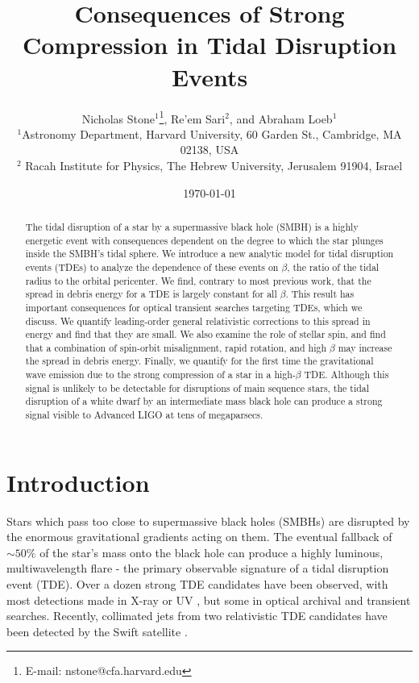 \documentclass[useAMS, twocolumn, usenatbib]{mn2e}
\title{Consequences of Strong Compression in Tidal Disruption Events}
\author[N.~Stone, R.~Sari and A.~Loeb]{Nicholas Stone$^1$\thanks{E-mail:
nstone@cfa.harvard.edu}, Re'em Sari$^2$, and Abraham Loeb$^1$
\\$^1$Astronomy Department, Harvard University, 60 Garden St.,
Cambridge, MA 02138, USA
\\$^2$ Racah Institute for Physics, The Hebrew University, Jerusalem 91904, Israel}
\begin{document}
\date{\today}
\maketitle


\begin{abstract}

The tidal disruption of a star by a supermassive black hole (SMBH) is a highly energetic event with consequences dependent on the degree to which the star plunges inside the SMBH's tidal sphere.  We introduce a new analytic model for tidal disruption events (TDEs) to analyze the dependence of these events on $\beta$, the ratio of the tidal radius to the orbital pericenter.  We find, contrary to most previous work, that the spread in debris energy for a TDE is largely constant for all $\beta$.  This result has important consequences for optical transient searches targeting TDEs, which we discuss.  We quantify leading-order general relativistic corrections to this spread in energy and find that they are small.  We also examine the role of stellar spin, and find that a combination of spin-orbit misalignment, rapid rotation, and high $\beta$ may increase the spread in debris energy.  Finally, we quantify for the first time the gravitational wave emission due to the strong compression of a star in a high-$\beta$ TDE.  Although this signal is unlikely to be detectable for disruptions of main sequence stars, the tidal disruption of a white dwarf by an intermediate mass black hole can produce a strong signal visible to Advanced LIGO at tens of megaparsecs.

\end{abstract}

\section{Introduction}
Stars which pass too close to supermassive black holes (SMBHs) are disrupted by the enormous gravitational gradients acting on them.  The eventual fallback of $\sim 50\%$ of the star's mass onto the black hole can produce a highly luminous, multiwavelength flare - the primary observable signature of a tidal disruption event (TDE).  Over a dozen strong TDE candidates have been observed, with most detections made in X-ray \citep{Bade+96, KomossaGreiner99, Gezari+03} or UV \citep{Gezari+06, Gezari+08, Gezari+09}, but some in optical archival \citep{vanVelzen+11} and transient \citep{Cenko+12, Gezari+12} searches.  Recently, collimated jets from two relativistic TDE candidates have been detected by the Swift satellite \citep{Levan+11, Bloom+11, Zauderer+11, Cenko+11}.  
\end{document}
